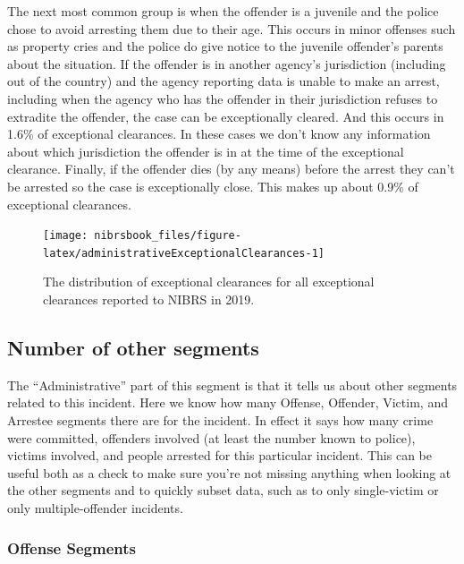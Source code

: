 \documentclass[
  12pt,
  openany]{book}
\begin{document}
The next most common group is when the offender is a juvenile and the police chose to avoid arresting them due to their age. This occurs in minor offenses such as property cries and the police do give notice to the juvenile offender's parents about the situation. If the offender is in another agency's jurisdiction (including out of the country) and the agency reporting data is unable to make an arrest, including when the agency who has the offender in their jurisdiction refuses to extradite the offender, the case can be exceptionally cleared. And this occurs in 1.6\% of exceptional clearances. In these cases we don't know any information about which jurisdiction the offender is in at the time of the exceptional clearance. Finally, if the offender dies (by any means) before the arrest they can't be arrested so the case is exceptionally close. This makes up about 0.9\% of exceptional clearances.

\begin{figure}

{\centering \texttt{[image: nibrsbook\_files/figure-latex/administrativeExceptionalClearances-1]} 

}

\caption{The distribution of exceptional clearances for all exceptional clearances reported to NIBRS in 2019.}\label{fig:administrativeExceptionalClearances}
\end{figure}

\hypertarget{number-of-other-segments}{%
\subsection{Number of other segments}\label{number-of-other-segments}}

The ``Administrative'' part of this segment is that it tells us about other segments related to this incident. Here we know how many Offense, Offender, Victim, and Arrestee segments there are for the incident. In effect it says how many crime were committed, offenders involved (at least the number known to police), victims involved, and people arrested for this particular incident. This can be useful both as a check to make sure you're not missing anything when looking at the other segments and to quickly subset data, such as to only single-victim or only multiple-offender incidents.

\hypertarget{offense-segments}{%
\subsubsection{Offense Segments}\label{offense-segments}}
\end{document}
